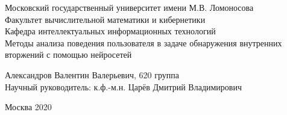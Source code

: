 \begin{center} 

\large Московский государственный университет имени М.В. Ломоносова\\
Факультет вычислительной математики и кибернетики\\
Кафедра интеллектуальных информационных технологий\\[5.5cm] 

\huge Методы анализа поведения пользователя в задаче обнаружения внутренних вторжений с помощью нейросетей \\[0.6cm] %


\end{center} 
\vspace{3.5cm} 
\begin{flushright}
Александров Валентин Валерьевич, 620 группа \\
Научный руководитель: к.ф.-м.н. Царёв Дмитрий Владимирович \\
\end{flushright}


\vfill 

\begin{center} 
\large Москва 2020
\end{center} 

\thispagestyle{empty}